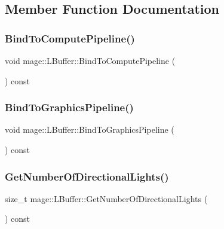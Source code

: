 \subsection{Member Function Documentation}
\hypertarget{structmage_1_1_l_buffer_abea057cfe64c13211a02cc2d080efe8e}{}\label{structmage_1_1_l_buffer_abea057cfe64c13211a02cc2d080efe8e} 
\subsubsection{\texorpdfstring{Bind\+To\+Compute\+Pipeline()}{BindToComputePipeline()}}
{\footnotesize\ttfamily void mage\+::\+L\+Buffer\+::\+Bind\+To\+Compute\+Pipeline (\begin{DoxyParamCaption}{ }\end{DoxyParamCaption}) const\hspace{0.3cm}{\ttfamily [noexcept]}}

\hypertarget{structmage_1_1_l_buffer_a1c732d078b14eb147662d4caee134cdb}{}\label{structmage_1_1_l_buffer_a1c732d078b14eb147662d4caee134cdb} 
\subsubsection{\texorpdfstring{Bind\+To\+Graphics\+Pipeline()}{BindToGraphicsPipeline()}}
{\footnotesize\ttfamily void mage\+::\+L\+Buffer\+::\+Bind\+To\+Graphics\+Pipeline (\begin{DoxyParamCaption}{ }\end{DoxyParamCaption}) const\hspace{0.3cm}{\ttfamily [noexcept]}}

\hypertarget{structmage_1_1_l_buffer_a6a32b15f7c55b21bb09fc79457a82392}{}\label{structmage_1_1_l_buffer_a6a32b15f7c55b21bb09fc79457a82392} 
\subsubsection{\texorpdfstring{Get\+Number\+Of\+Directional\+Lights()}{GetNumberOfDirectionalLights()}}
{\footnotesize\ttfamily size\+\_\+t mage\+::\+L\+Buffer\+::\+Get\+Number\+Of\+Directional\+Lights (\begin{DoxyParamCaption}{ }\end{DoxyParamCaption}) const\hspace{0.3cm}{\ttfamily [noexcept]}}

